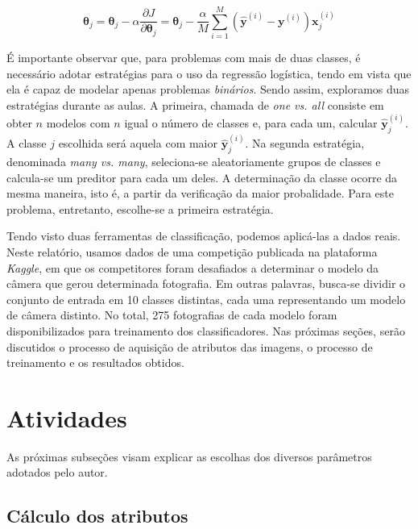 \documentclass[10pt,twocolumn,letterpaper]{article}
\begin{document}
\begin{equation}
\label {gd}
\bm{\theta}_j = \bm{\theta}_j - \alpha\frac{\partial J}{\partial \bm{\theta}_j } = \bm{\theta}_j - \frac{\alpha}{M} \displaystyle\sum_{i=1}^{M} \left(\bm{\hat{y}}^{(i)} - \bm{y}^{(i)}\right)\bm{x}_j^{(i)}
\end{equation}

É importante observar que, para problemas com mais de duas classes, é necessário adotar estratégias para o uso da regressão logística, tendo em vista que ela é capaz de modelar apenas problemas \textit {binários}. Sendo assim, exploramos duas estratégias durante as aulas. A primeira, chamada de \textit{one vs. all} consiste em obter \(n\) modelos com \(n\) igual o número de classes e, para cada um, calcular \(\bm{\hat{y}}^{(i)}_j\). A classe \(j\) escolhida será aquela com maior \(\bm{\hat{y}}^{(i)}_j\). Na segunda estratégia, denominada \textit{many vs. many}, seleciona-se aleatoriamente grupos de classes e calcula-se um preditor para cada um deles. A determinação da classe ocorre da mesma maneira, isto é, a partir da verificação da maior probalidade. Para este problema, entretanto, escolhe-se a primeira estratégia.

Tendo visto duas ferramentas de classificação, podemos aplicá-las a dados reais. Neste relatório, usamos dados de uma competição publicada na plataforma \textit{Kaggle}, em que os competitores foram desafiados a determinar o modelo da câmera que gerou determinada fotografia. Em outras palavras, busca-se dividir o conjunto de entrada em 10 classes distintas, cada uma representando um modelo de câmera distinto. No total, 275 fotografias de cada modelo foram disponibilizados para treinamento dos classificadores. Nas próximas seções, serão discutidos o processo de aquisição de atributos das imagens, o processo de treinamento e os resultados obtidos.

\section{Atividades}

As próximas subseções visam explicar as escolhas dos diversos parâmetros adotados pelo autor.

\subsection{Cálculo dos atributos}
\end{document}
